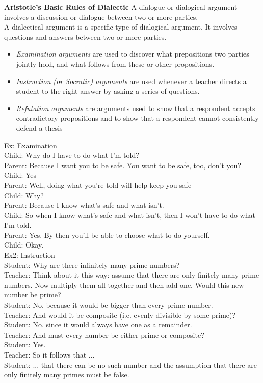 \documentclass[11pt, fleqn]{article}
\begin{document}
\textbf{Aristotle's Basic Rules of Dialectic}
A dialogue or dialogical argument involves a discussion or dialogue between two or more parties.\\
A dialectical argument is a specific type of dialogical argument. It involves questions and answers between two or more parties.
\begin{itemize}
    \item \textit{Examination arguments} are used to discover what prepositions two parties jointly hold, and what follows from these or other propositions.
    \item \textit{Instruction (or Socratic) arguments} are used whenever a teacher directs a student to the right answer by asking a series of questions.
    \item \textit{Refutation arguments} are arguments used to show that a respondent accepts contradictory propositions and to show that a respondent cannot consistently defend a thesis
\end{itemize}

Ex: Examination\\
Child: Why do I have to do what I'm told?\\
Parent: Because I want you to be safe. You want to be safe, too, don't you?\\
Child: Yes\\
Parent: Well, doing what you're told will help keep you safe\\
Child: Why?\\
Parent: Because I know what’s safe and what isn’t.\\
Child: So when I know what’s safe and what isn’t, then I won’t have to do what I’m told.\\
Parent: Yes. By then you’ll be able to choose what to do yourself.\\
Child: Okay.\\

Ex2: Instruction\\
Student: Why are there infinitely many prime numbers?\\
Teacher: Think about it this way: assume that there are only finitely many prime numbers. Now multiply them all together and then add one. Would this new number be prime?\\
Student: No, because it would be bigger than every prime number.\\
Teacher: And would it be composite (i.e. evenly divisible by some prime)?\\
Student: No, since it would always have one as a remainder.\\
Teacher: And must every number be either prime or composite?\\
Student: Yes.\\
Teacher: So it follows that ...\\
Student: ... that there can be no such number and the assumption that there are only finitely many primes must be false.\\
\end{document}
